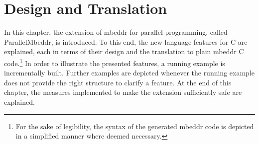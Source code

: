 \chapter{Design and Translation}
In this chapter, the extension of mbeddr for parallel programming, called ParallelMbeddr, is introduced. To this end, the new language features for C are explained, each in terms of their design and the translation to plain mbeddr C code.\footnote{For the sake of legibility, the syntax of the generated mbeddr code is depicted in a simplified manner where deemed necessary.} In order to illustrate the presented features, a running example is incrementally built. Further examples are depicted whenever the running example does not provide the right structure to clarify a feature. At the end of this chapter, the measures implemented to make the extension sufficiently safe are explained.





